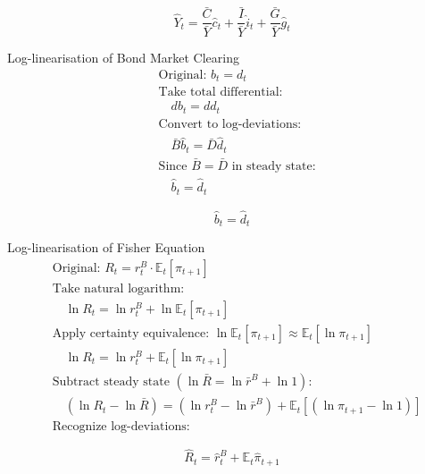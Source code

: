 \documentclass[11pt,preprint]{elsarticle}
\numberwithin{equation}{section}
\numberwithin{figure}{section}
\numberwithin{table}{section}
\begin{document}
\begin{equation}\label{clearing_resource_constraint_linearised_app}
\boxed{\hat{Y}_t = \frac{\bar{C}}{\bar{Y}} \hat{c}_t + \frac{\bar{I}}{\bar{Y}} \hat{i}_t + \frac{\bar{G}}{\bar{Y}} \hat{g}_t}
\end{equation}

Log-linearisation of Bond Market Clearing \begin{align*}
& \text{Original: } b_t = d_t \\[6pt]
& \text{Take total differential:} \\
& \quad db_t = dd_t \\[6pt]
& \text{Convert to log-deviations:} \\
& \quad \bar{B} \hat{b}_t = \bar{D} \hat{d}_t \\[6pt]
& \text{Since } \bar{B} = \bar{D} \text{ in steady state:} \\
& \quad \hat{b}_t = \hat{d}_t
\end{align*}

\begin{equation}\label{Bond_market_clear_linearised_app}
\boxed{\hat{b}_t = \hat{d}_t}
\end{equation}

Log-linearisation of Fisher Equation \begin{align*}
& \text{Original: } R_t = r^B_t \cdot \mathbb{E}_t[\pi_{t+1}] \\[6pt]
& \text{Take natural logarithm:} \\
& \quad \ln R_t = \ln r^B_t + \ln \mathbb{E}_t[\pi_{t+1}] \\[6pt]
& \text{Apply certainty equivalence: } \ln \mathbb{E}_t[\pi_{t+1}] \approx \mathbb{E}_t[\ln \pi_{t+1}] \\[6pt]
& \quad \ln R_t = \ln r^B_t + \mathbb{E}_t[\ln \pi_{t+1}] \\[6pt]
& \text{Subtract steady state } (\ln \bar{R} = \ln \bar{r}^B + \ln 1): \\
& \quad (\ln R_t - \ln \bar{R}) = (\ln r^B_t - \ln \bar{r}^B) + \mathbb{E}_t[(\ln \pi_{t+1} - \ln 1)] \\[6pt]
& \text{Recognize log-deviations:}
\end{align*}

\begin{equation}\label{fisher_linearised_app}
\boxed{\hat{R}_t = \hat{r}^B_t + \mathbb{E}_t \hat{\pi}_{t+1}}
\end{equation}
\end{document}
